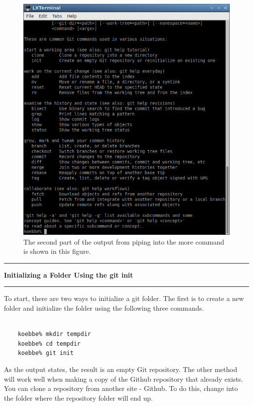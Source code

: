 \documentclass[10pt,fleqn]{article}
\begin{document}
\begin{figure}[h]
\centering
\includegraphics[width=5.0in]{../images/git_03.png}
\vskip0.1in
\caption{The second part of the output from piping into the more command is
shown in this figure.}
\end{figure}
\eject
\vskip0.1in\hrule\vskip0.1in\noindent
{\bf Initializing a Folder Using the git init} 
\vskip0.1in\hrule\vskip0.1in\noindent
To start, there are two ways to initialize a git folder. The first is to create
a new folder and initialize the folder using the following three commands.
\begin{verbatim}

    koebbe% mkdir tempdir
    koebbe% cd tempdir
    koebbe% git init

\end{verbatim}
As the output states, the result is an empty Git repository. The other method
will work well when making a copy of the Github repository that already exists.
You can clone a repository from another site - Github. To do this, change into
the folder where the repository folder will end up.
\vfill
\end{document}
